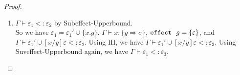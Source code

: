 \begin{proof}
\begin{enumerate}
\begin{enumerate}
\begin{enumerate}
\begin{enumerate}
            \item  If $\{x.g\} \in \varepsilon_1$, then $\varepsilon_1 = \varepsilon_1'\cup \{x.g\}$, and $\varepsilon_1' \subseteq \varepsilon_2'$. So we have $\Gamma \vdash \varepsilon_1'\cup [x/y]\varepsilon <: \varepsilon_2'\cup [x/y]\varepsilon$ by Subeffect-Subset. By IH, we have $\varepsilon_1'\cup[x/y]\varepsilon <: \varepsilon_3$. Then we use Subeffect-Upperbound to derive $\varepsilon_1' \cup \{x.g\} <: \varepsilon_3$
        \end{enumerate}       
        \item 
         $\Gamma \vdash \varepsilon_2 <: \varepsilon_3$ by Subeffect-Def-1.\\
        Let $\varepsilon_3 = \varepsilon_3' \cup \{x.g\}$. We have
        $\Gamma \vdash x : \{y \Rightarrow \sigma\}$,
        $\keyw{effect}\ g = \{\varepsilon\}$,
        and
        $\Gamma \vdash \varepsilon_2 <: \varepsilon_3' \cup [x/y]\varepsilon$.
        By IH, we have $\Gamma \vdash \varepsilon_1 <: \varepsilon_3' \cup [x/y]\varepsilon$
        Then we can use Subeffect-Def-1 again to derive $\Gamma \vdash \varepsilon_1 <: \varepsilon_3$
        

        \item $\Gamma \vdash \varepsilon_2 <: \varepsilon_3$ by Subeffect-Def-2.\\
        The proof is identical to ii.
    \end{enumerate}
    \item 
    $\Gamma \vdash \varepsilon_1 <: \varepsilon_2$ by Subeffect-Upperbound. \\
    So we have $\varepsilon_1 = \varepsilon_1' \cup \{x.g\}$.
    $\Gamma \vdash x : \{y \Rightarrow \sigma\}$,
    $\keyw{effect}\ g = \{\varepsilon\}$,
    and
    $\Gamma \vdash \varepsilon_1' \cup [x/y]\varepsilon <: \varepsilon_2$.
    Using IH, we have 
     $\Gamma \vdash \varepsilon_1' \cup [x/y]\varepsilon <: \varepsilon_3$.
     Using Suveffect-Upperbound again, we have 
     $\Gamma \vdash \varepsilon_1 <: \varepsilon_3$.


\end{enumerate}
\end{enumerate}
\end{proof}
